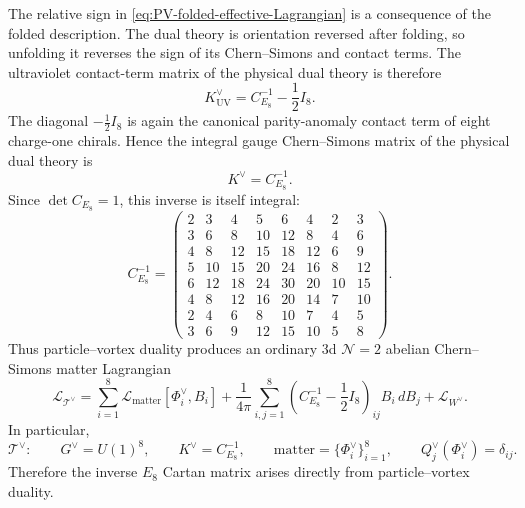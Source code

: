 \documentclass[11pt,a4paper]{article}
\numberwithin{equation}{section}
\begin{document}
The relative sign in \eqref{eq:PV-folded-effective-Lagrangian} is a consequence of the folded description.  The dual theory is orientation reversed after folding, so unfolding it reverses the sign of its Chern--Simons and contact terms.  The ultraviolet contact-term matrix of the physical dual theory is therefore
\begin{equation}
  K_{\mathrm{UV}}^\vee
  =C_{E_8}^{-1}-\frac12 I_8.
  \label{eq:dual-UV-contact}
\end{equation}
The diagonal $-\frac12 I_8$ is again the canonical parity-anomaly contact term of eight charge-one chirals.  Hence the integral gauge Chern--Simons matrix of the physical dual theory is
\begin{equation}
  K^\vee=C_{E_8}^{-1}.
  \label{eq:dual-integral-K}
\end{equation}
Since $\det C_{E_8}=1$, this inverse is itself integral:
\begin{equation}
C_{E_8}^{-1}
=
\begin{pmatrix}
2&3&4&5&6&4&2&3\\
3&6&8&10&12&8&4&6\\
4&8&12&15&18&12&6&9\\
5&10&15&20&24&16&8&12\\
6&12&18&24&30&20&10&15\\
4&8&12&16&20&14&7&10\\
2&4&6&8&10&7&4&5\\
3&6&9&12&15&10&5&8
\end{pmatrix}.
\label{eq:E8-inverse}
\end{equation}
Thus particle--vortex duality produces an ordinary 3d $\mathcal N=2$ abelian Chern--Simons matter Lagrangian
\begin{equation}
  \mathcal L_{\mathcal T^\vee}
  =
  \sum_{i=1}^{8}\mathcal L_{\mathrm{matter}}[\Phi_i^\vee,B_i]
  +\frac{1}{4\pi}
  \sum_{i,j=1}^{8}
  \left(C_{E_8}^{-1}-\frac12 I_8\right)_{ij}
  B_i\,dB_j
  +\mathcal L_{W^\vee}.
  \label{eq:dual-Lagrangian}
\end{equation}
In particular,
\begin{equation}
  \mathcal T^\vee:\qquad
  G^\vee=U(1)^8,
  \qquad
  K^\vee=C_{E_8}^{-1},
  \qquad
  \text{matter}=\{\Phi_i^\vee\}_{i=1}^{8},
  \qquad
  Q_j^\vee(\Phi_i^\vee)=\delta_{ij}.
  \label{eq:dual-UV-theory}
\end{equation}
Therefore the inverse $E_8$ Cartan matrix arises directly from particle--vortex duality.
\end{document}
